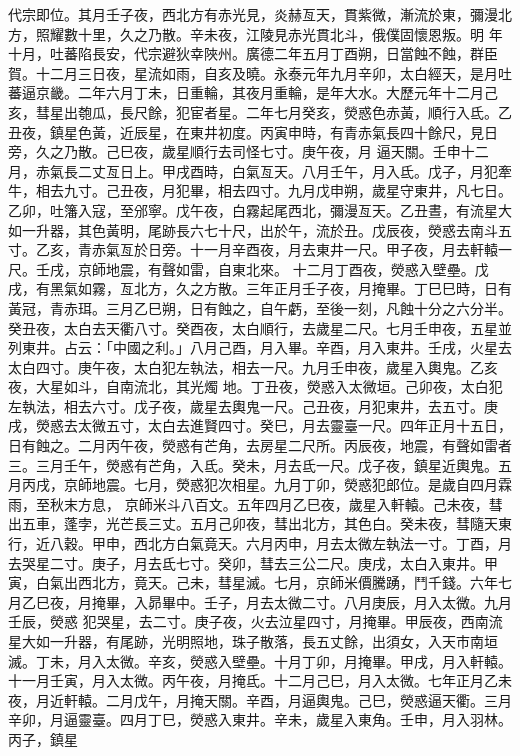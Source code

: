 \begin{pinyinscope}
 代宗即位。其月壬子夜，西北方有赤光見，炎赫亙天，貫紫微，漸流於東，彌漫北方，照耀數十里，久之乃散。辛未夜，江陵見赤光貫北斗，俄僕固懷恩叛。明
 年十月，吐蕃陷長安，代宗避狄幸陜州。廣德二年五月丁酉朔，日當蝕不蝕，群臣賀。十二月三日夜，星流如雨，自亥及曉。永泰元年九月辛卯，太白經天，是月吐蕃逼京畿。二年六月丁未，日重輪，其夜月重輪，是年大水。大歷元年十二月己亥，彗星出匏瓜，長尺餘，犯宦者星。二年七月癸亥，熒惑色赤黃，順行入氐。乙丑夜，鎮星色黃，近辰星，在東井初度。丙寅申時，有青赤氣長四十餘尺，見日旁，久之乃散。己巳夜，歲星順行去司怪七寸。庚午夜，月
 逼天關。壬申十二月，赤氣長二丈亙日上。甲戌酉時，白氣亙天。八月壬午，月入氐。戊子，月犯牽牛，相去九寸。己丑夜，月犯畢，相去四寸。九月戊申朔，歲星守東井，凡七日。乙卯，吐籓入寇，至邠寧。戊午夜，白霧起尾西北，彌漫亙天。乙丑晝，有流星大如一升器，其色黃明，尾跡長六七十尺，出於午，流於丑。戊辰夜，熒惑去南斗五寸。乙亥，青赤氣亙於日旁。十一月辛酉夜，月去東井一尺。甲子夜，月去軒轅一尺。壬戌，京師地震，有聲如雷，自東北來。
 十二月丁酉夜，熒惑入壁壘。戊戌，有黑氣如霧，亙北方，久之方散。三年正月壬子夜，月掩畢。丁巳巳時，日有黃冠，青赤珥。三月乙巳朔，日有蝕之，自午虧，至後一刻，凡蝕十分之六分半。癸丑夜，太白去天衢八寸。癸酉夜，太白順行，去歲星二尺。七月壬申夜，五星並列東井。占云：「中國之利。」八月己酉，月入畢。辛酉，月入東井。壬戌，火星去太白四寸。庚午夜，太白犯左執法，相去一尺。九月壬申夜，歲星入輿鬼。乙亥夜，大星如斗，自南流北，其光燭
 地。丁丑夜，熒惑入太微垣。己卯夜，太白犯左執法，相去六寸。戊子夜，歲星去輿鬼一尺。己丑夜，月犯東井，去五寸。庚戌，熒惑去太微五寸，太白去進賢四寸。癸巳，月去靈臺一尺。四年正月十五日，日有蝕之。二月丙午夜，熒惑有芒角，去房星二尺所。丙辰夜，地震，有聲如雷者三。三月壬午，熒惑有芒角，入氐。癸未，月去氐一尺。戊子夜，鎮星近輿鬼。五月丙戌，京師地震。七月，熒惑犯次相星。九月丁卯，熒惑犯郎位。是歲自四月霖雨，至秋末方息，
 京師米斗八百文。五年四月乙巳夜，歲星入軒轅。己未夜，彗出五車，蓬孛，光芒長三丈。五月己卯夜，彗出北方，其色白。癸未夜，彗隨天東行，近八穀。甲申，西北方白氣竟天。六月丙申，月去太微左執法一寸。丁酉，月去哭星二寸。庚子，月去氐七寸。癸卯，彗去三公二尺。庚戌，太白入東井。甲寅，白氣出西北方，竟天。己未，彗星滅。七月，京師米價騰踴，鬥千錢。六年七月乙巳夜，月掩畢，入昴畢中。壬子，月去太微二寸。八月庚辰，月入太微。九月壬辰，熒惑
 犯哭星，去二寸。庚子夜，火去泣星四寸，月掩畢。甲辰夜，西南流星大如一升器，有尾跡，光明照地，珠子散落，長五丈餘，出須女，入天市南垣滅。丁未，月入太微。辛亥，熒惑入壁壘。十月丁卯，月掩畢。甲戌，月入軒轅。十一月壬寅，月入太微。丙午夜，月掩氐。十二月己巳，月入太微。七年正月乙未夜，月近軒轅。二月戊午，月掩天關。辛酉，月逼輿鬼。己巳，熒惑逼天衢。三月辛卯，月逼靈臺。四月丁巳，熒惑入東井。辛未，歲星入東角。壬申，月入羽林。丙子，鎮星

\end{pinyinscope}
